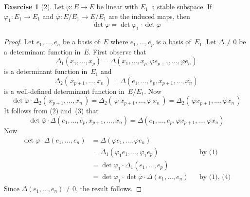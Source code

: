 \documentclass[letterpaper,12pt]{article}
\newcommand{\mult}{\cdot}
\newcommand{\proj}[1]{\overline{#1}}
\theoremstyle{definition}
\newtheorem*{exer}{Exercise}
\theoremstyle{remark}
\begin{document}
\begin{exer}[2]
Let \(\varphi:E\to E\) be linear with \(E_1\)~a stable subspace. If \(\varphi_1:E_1\to E_1\) and \(\proj{\varphi}:E/E_1\to E/E_1\) are the induced maps, then
\[\det\varphi=\det\varphi_1\mult\det\proj{\varphi}\]
\end{exer}
\begin{proof}
Let \(e_1,\ldots,e_n\) be a basis of~\(E\) where \(e_1,\ldots,e_p\) is a basis of~\(E_1\). Let \(\Delta\ne 0\) be a determinant function in~\(E\). First observe that
\[\Delta_1(x_1,\ldots,x_p)=\Delta(x_1,\ldots,x_p,\varphi e_{p+1},\ldots,\varphi e_n)\tag{1}\]
is a determinant function in~\(E_1\) and
\[\Delta_2(\,\proj{x_{p+1}},\ldots,\proj{x_n}\,)=\Delta(e_1,\ldots,e_p,x_{p+1},\ldots,x_n)\tag{2}\]
is a well-defined determinant function in~\(E/E_1\). Now
\[\det\proj{\varphi}\mult\Delta_2(\,\proj{x_{p+1}},\ldots,\proj{x_n}\,)=\Delta_2(\,\proj{\varphi}\ \proj{x_{p+1}},\ldots,\proj{\varphi}\ \proj{x_n}\,)=\Delta_2(\,\proj{\varphi x_{p+1}},\ldots,\proj{\varphi x_n}\,)\tag{3}\]
It follows from (2) and~(3) that
\[\det\proj{\varphi}\mult\Delta(e_1,\ldots,e_p,x_{p+1},\ldots,x_n)=\Delta(e_1,\ldots,e_p,\varphi x_{p+1},\ldots,\varphi x_n)\tag{4}\]
Now
\begin{align*}
\det\varphi\mult\Delta(e_1,\ldots,e_n)&=\Delta(\varphi e_1,\ldots,\varphi e_n)&&\\
	&=\Delta_1(\varphi_1 e_1,\ldots,\varphi_1 e_p)&&\text{by~(1)}\\
	&=\det\varphi_1\mult\Delta_1(e_1,\ldots,e_p)&&\\
	&=\det\varphi_1\mult\det\proj{\varphi}\mult\Delta(e_1,\ldots,e_n)&&\text{by (1), (4)}
\end{align*}
Since \(\Delta(e_1,\ldots,e_n)\ne 0\), the result follows.
\end{proof}
\end{document}
